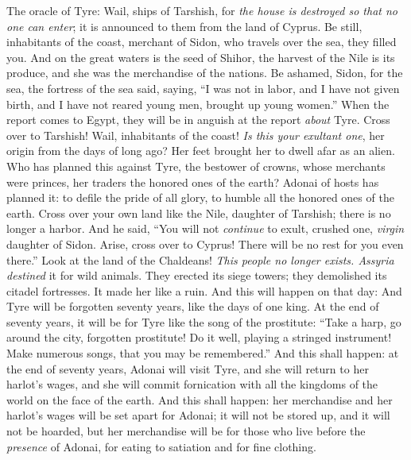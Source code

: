 \begin{biblechapter} %
 The oracle of Tyre:
\verse Wail, ships of Tarshish, for \textit{the house is destroyed so that no one can enter}; 
it is announced to them from the land of Cyprus.
\verse Be still, inhabitants of the coast, 
merchant of Sidon, who travels over the sea, they filled you.
\verse And on the great waters is the seed of Shihor, 
the harvest of the Nile is its produce, 
and she was the merchandise of the nations.
\verse Be ashamed, Sidon, for the sea, 
the fortress of the sea said, saying, 
“I was not in labor, 
and I have not given birth, 
and I have not reared young men, 
brought up young women.”
\verse When the report comes to Egypt, 
they will be in anguish at the report \textit{about} Tyre.
\verse Cross over to Tarshish! 
Wail, inhabitants of the coast!
\verse \textit{Is this your exultant one}, her origin from the days of long ago? 
Her feet brought her to dwell afar as an alien.
\verse Who has planned this against Tyre, the bestower of crowns, 
whose merchants were princes, 
her traders the honored ones of the earth?
\verse Adonai of hosts has planned it: 
to defile the pride of all glory, 
to humble all the honored ones of the earth.
\verse Cross over your own land like the Nile, daughter of Tarshish; 
there is no longer a harbor.
\verse And he said,
\verse “You will not \textit{continue} to exult, crushed one, \textit{virgin} daughter of Sidon. 
Arise, cross over to Cyprus! There will be no rest for you even there.”
\verse Look at the land of the Chaldeans! 
\textit{This people no longer exists. 
Assyria destined} it for wild animals. 
They erected its siege towers; 
they demolished its citadel fortresses. 
It made her like a ruin.
\verse And this will happen on that day: And Tyre will be forgotten seventy years, like the days of one king. At the end of seventy years, it will be for Tyre like the song of the prostitute:
\verse “Take a harp, 
go around the city, forgotten prostitute! 
Do it well, playing a stringed instrument! 
Make numerous songs, that you may be remembered.”
\verse And this shall happen: at the end of seventy years, Adonai will visit Tyre, and she will return to her harlot’s wages, 
and she will commit fornication 
with all the kingdoms of the world on the face of the earth.
\verse And this shall happen: her merchandise and her harlot’s wages will be set apart for Adonai; it will not be stored up, 
and it will not be hoarded, 
but her merchandise will be for those who live before the \textit{presence} of Adonai, 
for eating to satiation and for fine clothing.
\end{biblechapter}

